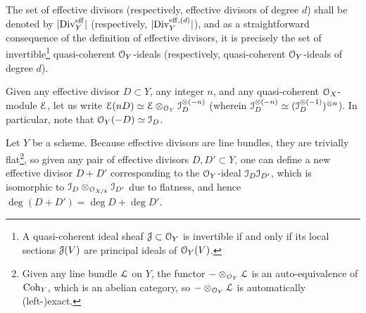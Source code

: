                 \begin{convention}
                    The set of effective divisors (respectively, effective divisors of degree $d$) shall be denoted by $|\mathrm{Div}_Y^{\mathrm{eff}}|$ (respectively, $|\mathrm{Div}_Y^{\mathrm{eff}, (d)}|$), and as a straightforward consequence of the definition of effective divisors, it is precisely the set of invertible\footnote{A quasi-coherent ideal sheaf $\mathcal{J} \subset \mathcal{O}_Y$ is invertible if and only if its local sections $\mathcal{J}(V)$ are principal ideals of $\mathcal{O}_Y(V)$.} quasi-coherent $\mathcal{O}_Y$-ideals (respectively, quasi-coherent $\mathcal{O}_Y$-ideals of degree $d$).
                \end{convention}
                \begin{convention}
                    Given any effective divisor $D \subset Y$, any integer $n$, and any quasi-coherent $\mathcal{O}_X$-module $\mathcal{E}$, let us write $\E(nD) \cong \E \tensor_{\calO_Y} \calI_D^{\tensor (-n)}$ (wherein $\calI_D^{\tensor (-n)} \cong (\calI_D^{\tensor (-1)})^{\tensor n}$). In particular, note that $\mathcal{O}_Y(-D) \simeq \mathcal{I}_D$.
                \end{convention}
                \begin{remark} \label{remark: adding_effective_divisors}
                    Let $Y$ be a scheme. Because effective divisors are line bundles, they are trivially flat\footnote{Given any line bundle $\mathcal{L}$ on $Y$, the functor $- \tensor_{\calO_Y} \calL$ is an auto-equivalence of $\mathrm{Coh}_Y$, which is an abelian category, so $- \tensor_{\calO_Y} \calL$ is automatically (left-)exact.}, so given any pair of effective divisors $D, D' \subset Y$, one can define a new effective divisor $D + D'$ corresponding to the $\mathcal{O}_Y$-ideal $\mathcal{I}_D \mathcal{I}_{D'}$, which is isomorphic to $\calI_D \tensor_{\calO_{X/k}} \calI_{D'}$ due to flatness, and hence $\deg(D + D') = \deg D + \deg D'$.
                \end{remark}
                
